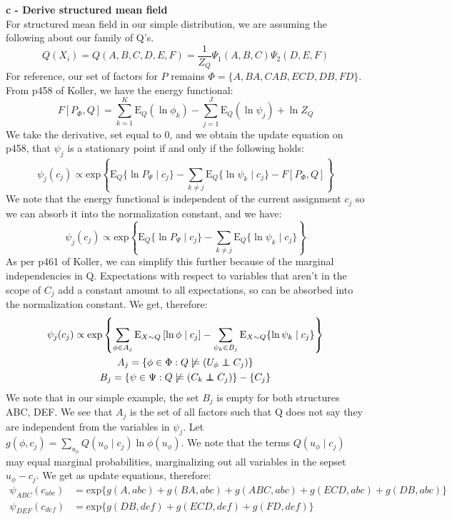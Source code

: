 \documentclass[12pt]{article}
\newcommand\independent{\protect\mathpalette{\protect\independenT}{\perp}}
\def\independenT#1#2{\mathrel{\rlap{$#1#2$}\mkern2mu{#1#2}}}
\begin{document}
\noindent \textbf{c - Derive structured mean field}\\
For structured mean field in our simple distribution, we are assuming the following about our family of Q's.
\[
Q(X_i) = Q(A,B,C,D,E,F) = \frac{1}{Z_Q} \Psi_1 (A,B,C) \Psi_2 (D,E,F)
\]
For reference, our set of factors for $P$ remains $\Phi = \lbrace A, BA, CAB, ECD, DB, FD\rbrace$.  From p458 of Koller, we have the energy functional:
\[
F\left[P_\Phi, Q\right] = \sum\limits_{k = 1}^{K} \mathrm{E}_Q (\ln \phi_k) - \sum\limits_{j = 1}^{J} \mathrm{E}_Q ( \ln \psi_j ) + \ln Z_Q
\]
We take the derivative, set equal to 0, and we obtain the update equation on p458, that $\psi_j$ is a stationary point if and only if the following holds:
\[
\psi_j(c_j) \propto \mathrm{exp} \left\lbrace \mathrm{E}_Q \lbrace \ln P_\Psi \mid c_j \rbrace - \sum_{k \not = j} \mathrm{E}_Q \lbrace \ln \psi_k \mid c_j \rbrace - F\left[P_\Phi, Q\right] \right\rbrace
\]
We note that the energy functional is independent of the current assignment $c_j$ so we can absorb it into the normalization constant, and we have:
\[
\psi_j(c_j) \propto \mathrm{exp} \left\lbrace \mathrm{E}_Q \lbrace \ln P_\Psi \mid c_j \rbrace - \sum_{k \not = j} \mathrm{E}_Q \lbrace \ln \psi_k \mid c_j \rbrace \right\rbrace
\]
As per p461 of Koller, we can simplify this further because of the marginal independencies in Q.  Expectations with respect to variables that aren't in the scope of $C_j$ add a constant amount to all expectations, so can be absorbed into the normalization constant.  We get, therefore:
\begin{multline*}
\psi_j(c_j) \propto \mathrm{exp} \left\lbrace \sum_{\phi \in A_j} \mathrm{E}_{X \sim Q} \left[ \ln \phi \mid c_j \right] - \sum_{\psi_k \in B_j} \mathrm{E}_{X \sim Q} \lbrace \ln \psi_k \mid c_j \rbrace \right\rbrace \\
A_j = \lbrace \phi \in \Phi : Q \not \models (U_\phi \independent C_j)\rbrace \\ 
B_j = \lbrace \psi \in \Psi : Q \not \models (C_k \independent C_j)\rbrace - \lbrace
 C_j \rbrace \\
\end{multline*}
We note that in our simple example, the set $B_j$ is empty for both structures ABC, DEF.  We see that $A_j$ is the set of all factors such that Q does not say they are independent from the variables in $\psi_j$.  Let $ g(\phi, c_j) = \sum_{u_\phi} Q(u_\phi \mid c_j) \ln \phi(u_\phi)$.  We note that the terms $Q(u_\phi \mid c_j)$ may equal marginal probabilities, marginalizing out all variables in the sepset $u_\phi - c_j$.  We get as update equations, therefore:
\begin{align*}
\psi_{ABC}(c_{abc}) &= \mathrm{exp} \lbrace g(A, abc) + g(BA, abc) + g(ABC,abc) + g(ECD, abc) + g(DB,abc) \rbrace \\ 
\psi_{DEF}(c_{def}) &= \mathrm{exp} \lbrace g(DB, def) + g(ECD, def) + g(FD,def) \rbrace \\ 
\end{align*}
\end{document}

